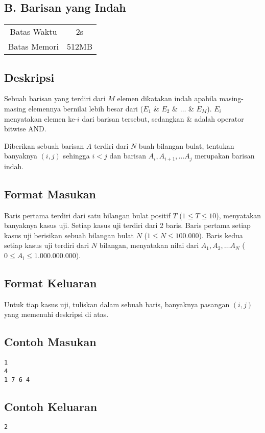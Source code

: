\documentclass{article}
\begin{document}
\begin{center}
    \section*{B. Barisan yang Indah}

    \begin{tabular}{ | c c | }
        \hline
        Batas Waktu  & 2s \\
        Batas Memori & 512MB \\
        \hline
    \end{tabular}
\end{center}

\subsection*{Deskripsi}
Sebuah barisan yang terdiri dari $M$ elemen dikatakan indah apabila masing-masing elemennya bernilai lebih besar dari ($E_1$ \& $E_2$ \& $\dots$ \& $E_M$).
$E_i$ menyatakan elemen ke-$i$ dari barisan tersebut, sedangkan \& adalah operator bitwise AND.

Diberikan sebuah barisan $A$ terdiri dari $N$ buah bilangan bulat, tentukan banyaknya $(i, j)$ sehingga $i < j$ dan barisan $A_i, A_{i+1}, \dots A_j$ merupakan barisan indah.

\subsection*{Format Masukan}
Baris pertama terdiri dari satu bilangan bulat positif $T$ ($1 \leq T \leq 10$), menyatakan banyaknya kasus uji.
Setiap kasus uji terdiri dari 2 baris.
Baris pertama setiap kasus uji berisikan sebuah bilangan bulat $N$ ($1 \leq N \leq 100.000$).
Baris kedua setiap kasus uji terdiri dari $N$ bilangan, menyatakan nilai dari $A_1, A_2, \dots A_N$ ($0 \leq A_i \leq 1.000.000.000$).

\subsection*{Format Keluaran}
Untuk tiap kasus uji, tuliskan dalam sebuah baris, banyaknya pasangan $(i, j)$ yang memenuhi deskripsi di atas.
\\

\begin{multicols}{2}
\subsection*{Contoh Masukan}
\begin{lstlisting}
1
4
1 7 6 4
\end{lstlisting}
\columnbreak
\subsection*{Contoh Keluaran}
\begin{lstlisting}
2
\end{lstlisting}
\vfill
\null
\end{multicols}
\end{document}
